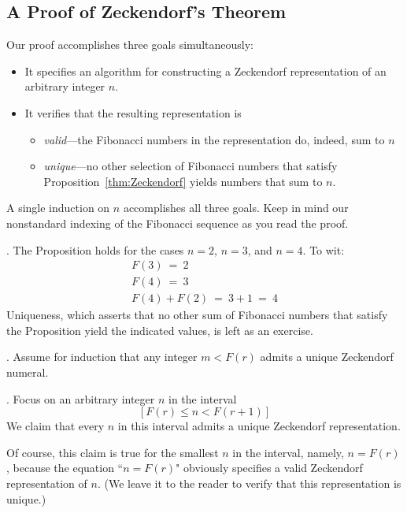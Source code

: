 \subsection{A Proof of Zeckendorf's Theorem}
\label{sec:Zeckendorf-proof}

Our proof accomplishes three goals simultaneously:
\begin{itemize}
\item
It specifies an algorithm for constructing a Zeckendorf representation of an arbitrary integer $n$.
\item
It verifies that the resulting representation is
  \begin{itemize}
  \item
{\em valid}---the Fibonacci numbers in the representation do, indeed, sum to $n$
  \item
{\em unique}---no other selection of Fibonacci numbers that satisfy Proposition~\ref{thm:Zeckendorf} yields numbers that sum to $n$.
  \end{itemize}
\end{itemize}
A single induction on $n$ accomplishes all three goals.  Keep in mind our nonstandard indexing of the Fibonacci sequence as you read the proof.

\medskip

.
The Proposition holds for the cases $n=2$, $n=3$, and $n=4$.  To wit:
\[ \begin{array}{l}
F(3) \ = \ 2 \\
F(4) \ = \ 3 \\
F(4) + F(2) \ = \ 3 + 1 \ = \ 4
\end{array}
\]
Uniqueness, which asserts that no other sum of Fibonacci numbers that satisfy the Proposition yield the indicated values, is left as an exercise.

\medskip

.
Assume for induction that any integer $m < F(r)$ admits a unique Zeckendorf numeral.

\medskip

.
Focus on an arbitrary integer $n$ in the interval
\[ [F(r) \leq n < F(r+1)] \]
We claim that every $n$ in this interval admits a unique Zeckendorf representation.

\smallskip

Of course, this claim is true for the smallest $n$ in the interval, namely, $n=F(r)$, because the equation ``$n=F(r)$" obviously specifies a valid Zeckendorf representation of $n$.  (We leave it to the reader to verify that this representation is unique.)

